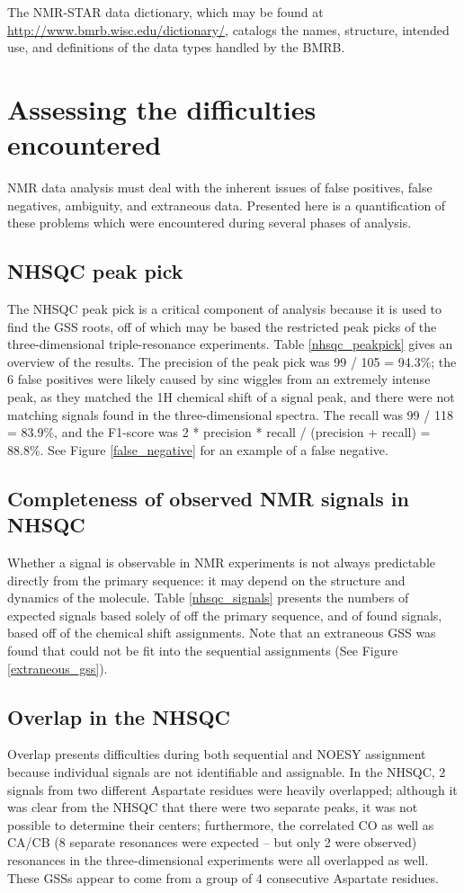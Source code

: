 The NMR-STAR data dictionary, which may be found at 
\url{http://www.bmrb.wisc.edu/dictionary/}, catalogs the names, structure,
intended use, and definitions of the data types handled by the BMRB.


\section{Assessing the difficulties encountered}
NMR data analysis must deal with the inherent issues of false positives, false 
negatives, ambiguity, and extraneous data.
Presented here is a quantification of these problems which were encountered
during several phases of analysis.

\subsection*{NHSQC peak pick}
The NHSQC peak pick is a critical component of analysis because it is used
to find the GSS roots, off of which may be based the restricted peak picks of
the three-dimensional triple-resonance experiments.
Table \ref{nhsqc_peakpick} gives an overview of the results.
The precision of the peak pick was 99 / 105 = 94.3\%{}; the 6 false positives 
were likely caused by sinc wiggles from an extremely intense peak, as they
matched the 1H chemical shift of a signal peak, and there were not matching
signals found in the three-dimensional spectra.
The recall was 99 / 118 = 83.9\%{}, and the 
F1-score was 2 * precision * recall / (precision + recall) = 88.8\%{}.
See Figure \ref{false_negative} for an example of a false negative.

\subsection*{Completeness of observed NMR signals in NHSQC}
Whether a signal is observable in NMR experiments is not always predictable
directly from the primary sequence:  it may depend on the structure and
dynamics of the molecule.  Table \ref{nhsqc_signals} presents the numbers
of expected signals based solely of off the primary sequence, and of found 
signals, based off of the chemical shift assignments.  Note that an 
extraneous GSS was found that could not be fit into the sequential assignments
(See Figure \ref{extraneous_gss}).

\subsection*{Overlap in the NHSQC}
Overlap presents difficulties during both sequential and NOESY assignment
because individual signals are not identifiable and assignable.
In the NHSQC, 2 signals from two different Aspartate residues were heavily
overlapped; although it was clear from the NHSQC that there were two separate
peaks, it was not possible to determine their centers; furthermore, the
correlated CO as well as CA/CB (8 separate resonances were expected -- but 
only 2 were observed) resonances in the three-dimensional experiments were all
overlapped as well.  These GSSs appear to come from a group of 4 consecutive
Aspartate residues.

